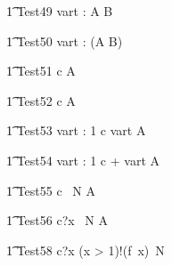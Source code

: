 \begin{circusaction}
  \t1 Test49 \circdef \circwait vart : \nat  \circspot  A \circseq   B \\
\end{circusaction}

\begin{circusaction}
  \t1 Test50 \circdef \circwait vart : \nat  \circspot  (A \circseq  B) \\
\end{circusaction}



\begin{circusaction}
   \t1 Test51 \circdef c \then  {} \rcirctime A \\
\end{circusaction}

\begin{circusaction}
   \t1 Test52 \circdef c \then  {}  \rcirctime A \\
\end{circusaction}

\begin{circusaction}
   \t1 Test53 \circdef \circvres vart : 1   \circspot c \then  \lcirctime vart \rcirctime A \\
\end{circusaction}

\begin{circusaction}
   \t1 Test54 \circdef \circvres vart : 1   \circspot c \then  {} + vart \rcirctime A \\
\end{circusaction}



\begin{circusaction}
   \t1 Test55 \circdef c \circat~N  \then A \\
\end{circusaction}

\begin{circusaction}
   \t1 Test56 \circdef c?x \circat~N  \then A \\
\end{circusaction}

\begin{circusaction}
   \t1 Test58 \circdef c?x \prefixcolon (x > 1)!(f~x)\circat~N \then \Skip
\end{circusaction}

